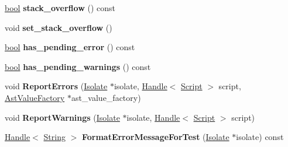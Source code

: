 \begin{DoxyCompactItemize}
\mbox{\hyperlink{classbool}{bool}} {\bfseries stack\+\_\+overflow} () const
\item 
\mbox{\label{classv8_1_1internal_1_1PendingCompilationErrorHandler_ac9315a7267d1fb242221cbc82af24088}} 
void {\bfseries set\+\_\+stack\+\_\+overflow} ()
\item 
\mbox{\label{classv8_1_1internal_1_1PendingCompilationErrorHandler_a2e1e503fce11daf86e4935f6d6920473}} 
\mbox{\hyperlink{classbool}{bool}} {\bfseries has\+\_\+pending\+\_\+error} () const
\item 
\mbox{\label{classv8_1_1internal_1_1PendingCompilationErrorHandler_a3c47c0707b252b2184845d99d08abdb4}} 
\mbox{\hyperlink{classbool}{bool}} {\bfseries has\+\_\+pending\+\_\+warnings} () const
\item 
\mbox{\label{classv8_1_1internal_1_1PendingCompilationErrorHandler_a9c0a7fd186ba8c79987a6d1d5631b9c6}} 
void {\bfseries Report\+Errors} (\mbox{\hyperlink{classv8_1_1internal_1_1Isolate}{Isolate}} $\ast$isolate, \mbox{\hyperlink{classv8_1_1internal_1_1Handle}{Handle}}$<$ \mbox{\hyperlink{classv8_1_1internal_1_1Script}{Script}} $>$ script, \mbox{\hyperlink{classv8_1_1internal_1_1AstValueFactory}{Ast\+Value\+Factory}} $\ast$ast\+\_\+value\+\_\+factory)
\item 
\mbox{\label{classv8_1_1internal_1_1PendingCompilationErrorHandler_ae7954e74c1384d6c5ba336074afdd5cd}} 
void {\bfseries Report\+Warnings} (\mbox{\hyperlink{classv8_1_1internal_1_1Isolate}{Isolate}} $\ast$isolate, \mbox{\hyperlink{classv8_1_1internal_1_1Handle}{Handle}}$<$ \mbox{\hyperlink{classv8_1_1internal_1_1Script}{Script}} $>$ script)
\item 
\mbox{\label{classv8_1_1internal_1_1PendingCompilationErrorHandler_ab86df2c56257fee6d8eb7a43348a5a75}} 
\mbox{\hyperlink{classv8_1_1internal_1_1Handle}{Handle}}$<$ \mbox{\hyperlink{classv8_1_1internal_1_1String}{String}} $>$ {\bfseries Format\+Error\+Message\+For\+Test} (\mbox{\hyperlink{classv8_1_1internal_1_1Isolate}{Isolate}} $\ast$isolate) const

\end{DoxyCompactItemize}
